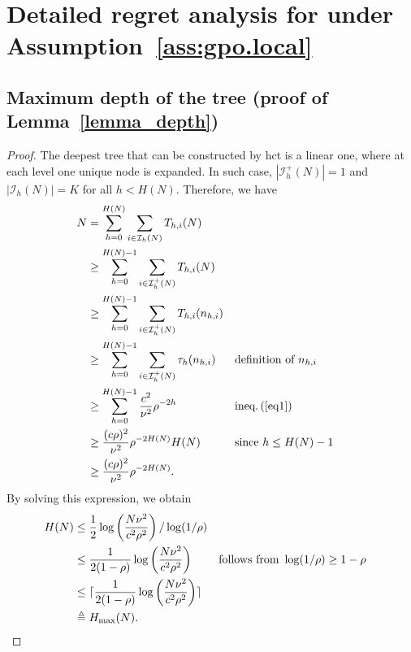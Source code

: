 \section{Detailed regret analysis for \HCT{} under Assumption~\ref{ass:gpo.local}}\label{app:gpo.hct}

\subsection{Maximum depth of the tree (proof of Lemma~\ref{lemma_depth})}\label{proof:lemma_depth}
\restalemmadepth*

\begin{proof}
The deepest tree that can be constructed by \gls{hct} is a linear one, where at each level one unique node is expanded. In such case,   $|\mathcal{I}_h^{+}(N)|=1$ and $|\mathcal{I}_h(N)|=K$ for all $h<H(N)$. Therefore, we have
\begin{align*}
    N & = \sum_{h=0}^{H(N)}\sum_{i\in\mathcal{I}_h(N)} T_{h,i}(N) \\
      & \geq \sum_{h=0}^{H(N)-1}\sum_{i\in\mathcal{I}_h^{+}(N)} T_{h,i}(N) \\
      & \geq \sum_{h=0}^{H(N)-1}\sum_{i\in\mathcal{I}_h^{+}(N)} T_{h,i}(n_{h,i}) \\
      & \geq \sum_{h=0}^{H(N)-1}\sum_{i\in\mathcal{I}_h^{+}(N)} \tau_h(n_{h,i}) && \text{definition of } n_{h,i} \\
      & \geq \sum_{h=0}^{H(N)-1}\frac{c^2}{\nu^2}\rho^{-2h} && \text{ineq.\,(\ref{eq1})} \\
      & \geq \frac{(c\rho)^2}{\nu^2}\rho^{-2H(N)}H(N) && \text{since } h\leq H(N)-1 \\
      & \geq \frac{(c\rho)^2}{\nu^2}\rho^{-2H(N)}.
\end{align*}
By solving this expression, we obtain
\begin{align*}
    H(N) & \leq \frac{1}{2}\log\left(                \frac{N\nu^2}{c^2\rho^2} \right)/\log(1/\rho) \\
         & \leq \frac{1}{2(1-\rho)}\log\left(
    \frac{N\nu^2}{c^2\rho^2} \right) && \text{follows from } \log(1/\rho)\geq 1-\rho \\
	& \leq \lceil\frac{1}{2(1-\rho)}\log\left(
    \frac{N\nu^2}{c^2\rho^2} \right)\rceil \\
         & \triangleq H_{\max}(N).
\end{align*}
\end{proof}

